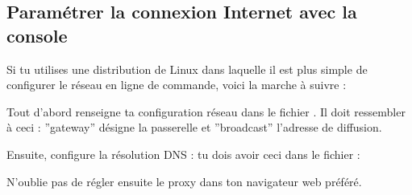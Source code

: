 \subsection{Param\'etrer la connexion Internet avec la console}
\label{linux_cmdline}
Si tu utilises une distribution de Linux dans laquelle il est plus simple de configurer le r\'eseau en ligne de commande, voici la marche \`a suivre :

Tout d'abord renseigne ta configuration r\'eseau dans le fichier . Il doit ressembler \`a ceci :
\noindent {}
''gateway'' d\'esigne la passerelle et ''broadcast'' l'adresse de diffusion.
\newline

Ensuite, configure la r\'esolution DNS : tu dois avoir ceci dans le fichier  :
\noindent {}

N'oublie pas de r\'egler ensuite le proxy dans ton navigateur web pr\'ef\'er\'e.
